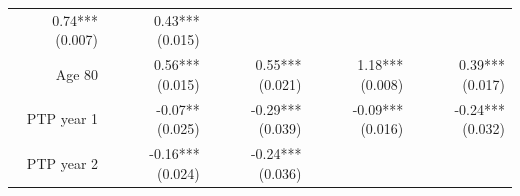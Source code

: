 \documentclass[]{article}
\begin{document}
\begin{longtable}[c]{@{}rrrrr@{}}
\begin{minipage}[t]{0.18\columnwidth}\raggedleft\strut
0.74*** (0.007)
\strut\end{minipage} &
\begin{minipage}[t]{0.15\columnwidth}\raggedleft\strut
0.43*** (0.015)
\strut\end{minipage}\tabularnewline
\begin{minipage}[t]{0.17\columnwidth}\raggedleft\strut
Age 80
\strut\end{minipage} &
\begin{minipage}[t]{0.20\columnwidth}\raggedleft\strut
0.56*** (0.015)
\strut\end{minipage} &
\begin{minipage}[t]{0.16\columnwidth}\raggedleft\strut
0.55*** (0.021)
\strut\end{minipage} &
\begin{minipage}[t]{0.18\columnwidth}\raggedleft\strut
1.18*** (0.008)
\strut\end{minipage} &
\begin{minipage}[t]{0.15\columnwidth}\raggedleft\strut
0.39*** (0.017)
\strut\end{minipage}\tabularnewline
\begin{minipage}[t]{0.17\columnwidth}\raggedleft\strut
PTP year 1
\strut\end{minipage} &
\begin{minipage}[t]{0.20\columnwidth}\raggedleft\strut
-0.07** (0.025)
\strut\end{minipage} &
\begin{minipage}[t]{0.16\columnwidth}\raggedleft\strut
-0.29*** (0.039)
\strut\end{minipage} &
\begin{minipage}[t]{0.18\columnwidth}\raggedleft\strut
-0.09*** (0.016)
\strut\end{minipage} &
\begin{minipage}[t]{0.15\columnwidth}\raggedleft\strut
-0.24*** (0.032)
\strut\end{minipage}\tabularnewline
\begin{minipage}[t]{0.17\columnwidth}\raggedleft\strut
PTP year 2
\strut\end{minipage} &
\begin{minipage}[t]{0.20\columnwidth}\raggedleft\strut
-0.16*** (0.024)
\strut\end{minipage} &
\begin{minipage}[t]{0.16\columnwidth}\raggedleft\strut
-0.24*** (0.036)
\strut\end{minipage} &

\end{longtable}
\end{document}
